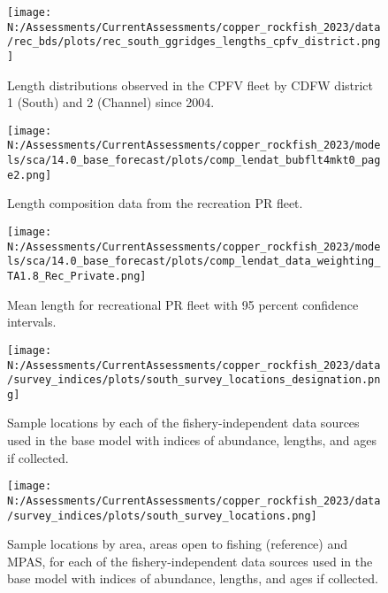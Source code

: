 \documentclass[11pt,
  english,
  letterpaper,
]{article}
\begin{document}
\pagebreak

\begin{figure}
\centering
\texttt{[image: N:/Assessments/CurrentAssessments/copper\_rockfish\_2023/data/rec\_bds/plots/rec\_south\_ggridges\_lengths\_cpfv\_district.png]}
\caption{Length distributions observed in the CPFV fleet by CDFW district 1 (South) and 2 (Channel) since 2004.\label{fig:rec-cpfv-dist}}
\end{figure}

\pagebreak

\begin{figure}
\centering
\texttt{[image: N:/Assessments/CurrentAssessments/copper\_rockfish\_2023/models/sca/14.0\_base\_forecast/plots/comp\_lendat\_bubflt4mkt0\_page2.png]}
\caption{Length composition data from the recreation PR fleet.\label{fig:rec-pr-len-data}}
\end{figure}

\pagebreak

\begin{figure}
\centering
\texttt{[image: N:/Assessments/CurrentAssessments/copper\_rockfish\_2023/models/sca/14.0\_base\_forecast/plots/comp\_lendat\_data\_weighting\_TA1.8\_Rec\_Private.png]}
\caption{Mean length for recreational PR fleet with 95 percent confidence intervals.\label{fig:mean-rec-pr-len-data}}
\end{figure}

\pagebreak

\begin{figure}
\centering
\texttt{[image: N:/Assessments/CurrentAssessments/copper\_rockfish\_2023/data/survey\_indices/plots/south\_survey\_locations\_designation.png]}
\caption{Sample locations by each of the fishery-independent data sources used in the base model with indices of abundance, lengths, and ages if collected.\label{fig:survey-locations}}
\end{figure}

\pagebreak

\begin{figure}
\centering
\texttt{[image: N:/Assessments/CurrentAssessments/copper\_rockfish\_2023/data/survey\_indices/plots/south\_survey\_locations.png]}
\caption{Sample locations by area, areas open to fishing (reference) and MPAS, for each of the fishery-independent data sources used in the base model with indices of abundance, lengths, and ages if collected.\label{fig:ref-mpa}}
\end{figure}
\end{document}
